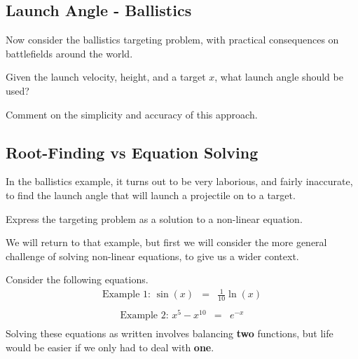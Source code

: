 \vfill


\vfill

\newpage


\subsection*{Launch Angle - Ballistics}

Now consider the ballistics targeting problem, with practical
consequences on battlefields around the world.
\begin{center}
  Given the launch velocity, height, and a target $x$, what launch
  angle should be used?
\end{center}

\newpage 


\vfill

Comment on the simplicity and accuracy of this approach.

\newpage

\subsection*{Root-Finding vs Equation Solving}

In the ballistics example, it turns out to be very laborious, and
fairly inaccurate, to find the launch angle that will launch a
projectile on to a target.

\problem Express the targeting problem as a solution to a non-linear
equation.

\vfill

We will return to that example, but first we will consider the more
general challenge of solving non-linear equations, to give us a wider
context.

\newpage

Consider the following equations.
\begin{eqnarray*}
\mbox{Example 1: }\sin(x)  &  =  & \frac{1}{10} \ln(x) \\
\end{eqnarray*}
\begin{eqnarray*}
\mbox{Example 2: } x^5 - x^{10}   &  =  & e^{-x} \\
\end{eqnarray*}
Solving these equations as written involves balancing {\bf two}
functions, but life would be easier if we only had to deal with {\bf
  one}.

